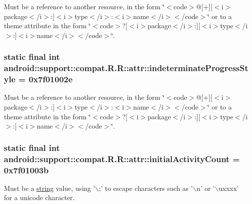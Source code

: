 Must be a reference to another resource, in the form \char`\"{}$<$code$>$@\mbox{[}+\mbox{]}\mbox{[}$<$i$>$package$<$/i$>$:\mbox{]}$<$i$>$type$<$/i$>$:$<$i$>$name$<$/i$>$$<$/code$>$\char`\"{} or to a theme attribute in the form \char`\"{}$<$code$>$?\mbox{[}$<$i$>$package$<$/i$>$:\mbox{]}\mbox{[}$<$i$>$type$<$/i$>$:\mbox{]}$<$i$>$name$<$/i$>$$<$/code$>$\char`\"{}. \hypertarget{classandroid_1_1support_1_1compat_1_1_r_1_1attr_66e80b607fc68173a39ddbf942f9dc8a}{
\subsubsection[{indeterminateProgressStyle}]{\setlength{\rightskip}{0pt plus 5cm}static final int android::support::compat.R.R::attr::indeterminateProgressStyle = 0x7f01002e}}
\label{classandroid_1_1support_1_1compat_1_1_r_1_1attr_66e80b607fc68173a39ddbf942f9dc8a}


Must be a reference to another resource, in the form \char`\"{}$<$code$>$@\mbox{[}+\mbox{]}\mbox{[}$<$i$>$package$<$/i$>$:\mbox{]}$<$i$>$type$<$/i$>$:$<$i$>$name$<$/i$>$$<$/code$>$\char`\"{} or to a theme attribute in the form \char`\"{}$<$code$>$?\mbox{[}$<$i$>$package$<$/i$>$:\mbox{]}\mbox{[}$<$i$>$type$<$/i$>$:\mbox{]}$<$i$>$name$<$/i$>$$<$/code$>$\char`\"{}. \hypertarget{classandroid_1_1support_1_1compat_1_1_r_1_1attr_0c88ca3a41209c0438494c739127de83}{
\subsubsection[{initialActivityCount}]{\setlength{\rightskip}{0pt plus 5cm}static final int android::support::compat.R.R::attr::initialActivityCount = 0x7f01003b}}
\label{classandroid_1_1support_1_1compat_1_1_r_1_1attr_0c88ca3a41209c0438494c739127de83}


Must be a \hyperlink{classandroid_1_1support_1_1compat_1_1_r_1_1string}{string} value, using '$\backslash$;' to escape characters such as '$\backslash$n' or '$\backslash$uxxxx' for a unicode character. 

